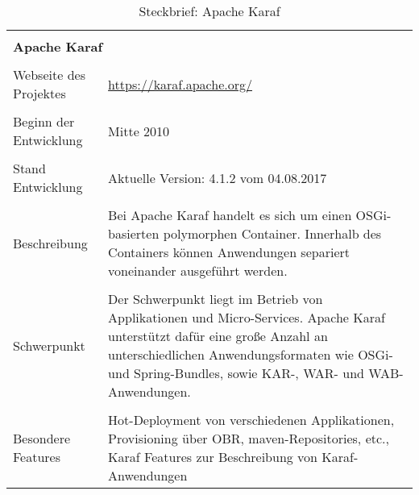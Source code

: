 \begin{table}[H]
 \centering
 \caption{Steckbrief: Apache Karaf}
 \begin{framed}
 \begin{tabular}{l|l|l|l}
  \multicolumn{4}{l}{}\\
  \multicolumn{4}{l}{\textbf{Apache Karaf}}\\
  \multicolumn{4}{l}{}\\
  \toprule
  \multicolumn{2}{l|}{Webseite des Projektes} & \multicolumn{2}{p{8cm}}{\url{https://karaf.apache.org/}}\\
  
  \multicolumn{2}{l|}{} & \multicolumn{2}{l}{}\\
  
  \multicolumn{2}{l|}{Beginn der Entwicklung} & \multicolumn{2}{p{8cm}}{Mitte 2010}\\
  
  \multicolumn{2}{l|}{} & \multicolumn{2}{l}{}\\
  
  \multicolumn{2}{l|}{Stand Entwicklung} & \multicolumn{2}{p{8cm}}{Aktuelle Version: 4.1.2 vom 04.08.2017} \\
  
  \multicolumn{2}{l|}{} & \multicolumn{2}{l}{} \\
  
  \multicolumn{2}{l|}{Beschreibung} &  \multicolumn{2}{p{8cm}}{
  Bei Apache Karaf handelt es sich um einen OSGi-basierten polymorphen Container.
  Innerhalb des Containers können Anwendungen separiert voneinander ausgeführt werden.
  } \\
  
  \multicolumn{2}{l|}{} & \multicolumn{2}{l}{} \\
  
  \multicolumn{2}{l|}{Schwerpunkt} &  \multicolumn{2}{p{8cm}}{
  Der Schwerpunkt liegt im Betrieb von Applikationen und Micro-Services. Apache Karaf unterstützt dafür eine 
  große Anzahl an unterschiedlichen Anwendungsformaten wie OSGi- und Spring-Bundles, sowie \ac{KAR}-, \ac{WAR}- und \ac{WAB}-Anwendungen.
  } \\
  
  \multicolumn{2}{l|}{} & \multicolumn{2}{l}{} \\
  
  \multicolumn{2}{l|}{Besondere Features} & \multicolumn{2}{p{8cm}}{
  Hot-Deployment von verschiedenen Applikationen,
  Provisioning über \ac{OBR}, maven-Repositories, etc.,
  Karaf Features zur Beschreibung von Karaf-Anwendungen } \\
  

\end{tabular}
\end{framed}
\end{table}
